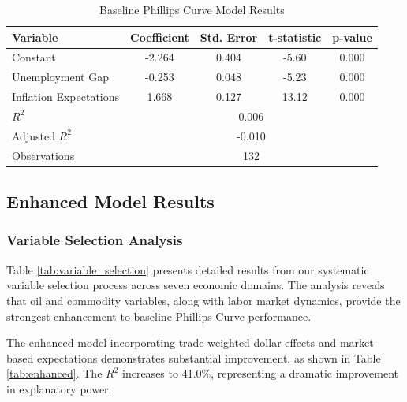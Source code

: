 \documentclass[12pt]{article}
\begin{document}
\begin{table}[H]
\centering
\caption{Baseline Phillips Curve Model Results}
\label{tab:baseline}
\begin{tabular}{lcccc}
\toprule
Variable & Coefficient & Std. Error & t-statistic & p-value \\
\midrule
Constant & -2.264 & 0.404 & -5.60 & 0.000 \\
Unemployment Gap & -0.253 & 0.048 & -5.23 & 0.000 \\
Inflation Expectations & 1.668 & 0.127 & 13.12 & 0.000 \\
\midrule
$R^2$ & \multicolumn{4}{c}{0.006} \\
Adjusted $R^2$ & \multicolumn{4}{c}{-0.010} \\
Observations & \multicolumn{4}{c}{132} \\
\bottomrule
\end{tabular}
\end{table}

\subsection{Enhanced Model Results}

\subsubsection{Variable Selection Analysis}

Table \ref{tab:variable_selection} presents detailed results from our systematic variable selection process across seven economic domains. The analysis reveals that oil and commodity variables, along with labor market dynamics, provide the strongest enhancement to baseline Phillips Curve performance.


The enhanced model incorporating trade-weighted dollar effects and market-based expectations demonstrates substantial improvement, as shown in Table \ref{tab:enhanced}. The $R^2$ increases to 41.0\%, representing a dramatic improvement in explanatory power.
\end{document}

